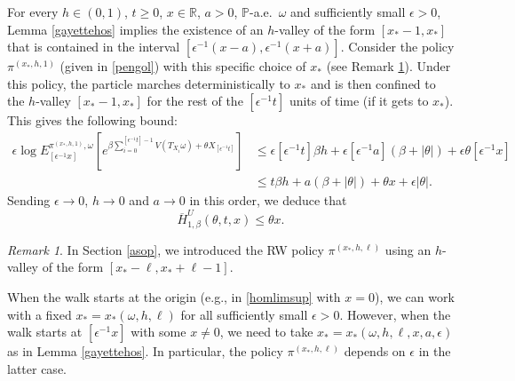 \documentclass[a4paper]{amsart}
\numberwithin{equation}{section}
\theoremstyle{plain}
\theoremstyle{remark}
\newtheorem{remark}[theorem]{\sc Remark}
\begin{document}
For every $h\in(0,1)$, $t\ge0$, $x\in\mathbb{R}$, $a>0$, $\mathbb{P}$-a.e.\ $\omega$ and sufficiently small ${\epsilon}>0$, Lemma \ref{gayettehos} implies the existence of an $h$-valley of the form $[x_* - 1,x_*]$ that is contained in the interval $[{\epsilon^{-1}}(x-a),{\epsilon^{-1}}(x+a)]$. Consider the policy ${\pi^{(x_*,h,1)}}$ (given in \eqref{pengol}) with this specific choice of $x_*$ (see Remark \ref{dundundur}). Under this policy, the particle marches deterministically to $x_*$ and is then confined to the $h$-valley $[x_*-1,x_*]$ for the rest of the $[{\epsilon^{-1}} t]$ units of time (if it gets to $x_*$). This gives the following bound:
\begin{equation}
\begin{aligned}\label{mazharfu}
{\epsilon}\log E_{[{\epsilon^{-1}} x]}^{{\pi^{(x_*,h,1)}},\omega}\left[e^{\beta\sum_{i=0}^{[{\epsilon^{-1}} t]-1}V(T_{X_i}\omega) + \theta X_{[{\epsilon^{-1}} t]}}\right] &\le {\epsilon}[{\epsilon^{-1}} t]\beta h + {\epsilon}[{\epsilon^{-1}} a](\beta + |\theta|) + {\epsilon}\theta [{\epsilon^{-1}} x]\\
&\le t\beta h + a(\beta + |\theta|) + \theta x + {\epsilon}|\theta|. 
\end{aligned}
\end{equation}
Sending ${\epsilon}\to0$, $h\to0$ and $a\to0$ {}{in this order}, we deduce that
\begin{equation}\label{UBfull1}
\overline H_{1,\beta}^U(\theta,t,x) \le \theta x.
\end{equation}

\begin{remark}\label{dundundur}
	In Section \ref{asop}, we introduced the RW policy ${\pi^{(x_*,h,\ell)}}$ using an $h$-valley of the form $[x_*-\ell,x_*+\ell-1]$. 
	
	When the walk starts at the origin (e.g., in \eqref{homlimsup} with $x=0$), we can work with a fixed $x_* = x_*(\omega,h,\ell)$ for all sufficiently small ${\epsilon}>0$. However, when the walk starts at $[{\epsilon^{-1}} x]$ with some $x\ne0$, we need to take $x_* = x_*(\omega,h,\ell,x,a,{\epsilon})$ as in Lemma \ref{gayettehos}. In particular, the policy ${\pi^{(x_*,h,\ell)}}$ depends on ${\epsilon}$ in the latter case.
\end{remark}
\end{document}
